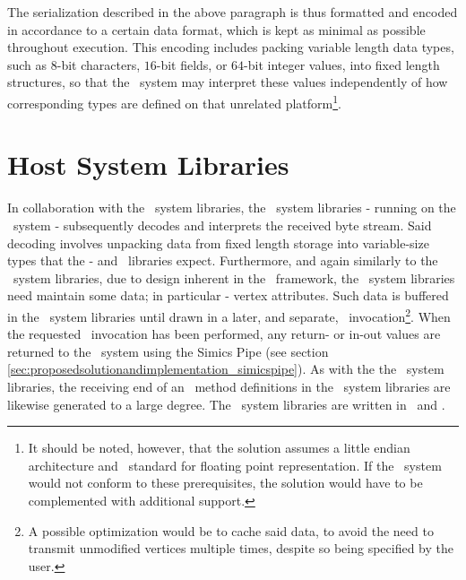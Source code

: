 The serialization described in the above paragraph is thus formatted and encoded in accordance to a certain data format, which is kept as minimal as possible throughout execution.
This encoding includes packing variable length data types, such as $8$-bit characters, $16$-bit fields, or $64$-bit integer values, into fixed length structures, so that the \dvttermhost\ system may interpret these values independently of how corresponding types are defined on that unrelated platform\footnote{It should be noted, however, that the solution assumes a little endian architecture and \dvttermieeefp\ standard for floating point representation. If the \dvttermhost\ system would not conform to these prerequisites, the solution would have to be complemented with additional support.}.

\section{Host System Libraries}
\label{sec:proposedsolutionandimplementation_hostsystemlibraries}
In collaboration with the \dvttermtarget\ system libraries, the \dvttermhost\ system libraries - running on the \dvttermhost\ system - subsequently decodes and interprets the received byte stream.
Said decoding involves unpacking data from fixed length storage into variable-size types that the \dvttermopengl - and \dvttermegl\ libraries expect.
Furthermore, and again similarly to the \dvttermtarget\ system libraries, due to design inherent in the \dvttermopenglestwopointo\ framework, the \dvttermhost\ system libraries need maintain some data; in particular - vertex attributes.
Such data is buffered in the \dvttermhost\ system libraries until drawn in a later, and separate, \dvttermopengl\ invocation\footnote{A possible optimization would be to cache said data, to avoid the need to transmit unmodified vertices multiple times, despite so being specified by the user.}.
When the requested \dvttermopengl\ invocation has been performed, any return- or in-out values are returned to the \dvttermtarget\ system using the Simics Pipe (see section \ref{sec:proposedsolutionandimplementation_simicspipe}).
As with the the \dvttermtarget\ system libraries, the receiving end of an \dvttermopengl\ method definitions in the \dvttermhost\ system libraries are likewise generated to a large degree.
The \dvttermhost\ system libraries are written in \dvttermc\ and \dvttermcplusplus .

